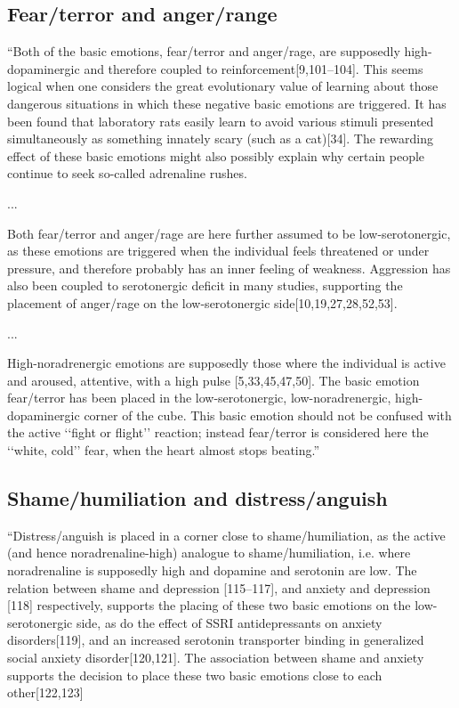 \subsection{Fear/terror and anger/range}

``Both of the basic emotions, fear/terror and anger/rage, are supposedly high-dopaminergic and therefore coupled to reinforcement[9,101–104]. This seems logical when one considers the great evolutionary value of learning about those dangerous situations in which these negative basic emotions are triggered. It has been found that laboratory rats easily learn to avoid various stimuli presented simultaneously as something innately scary (such as a cat)[34]. The rewarding effect of these basic emotions might also possibly explain why certain people continue to seek so-called adrenaline rushes. 

... 

Both fear/terror and anger/rage are here further assumed to be low-serotonergic, as these emotions are triggered when the individual feels threatened or under pressure, and therefore probably has an inner feeling of weakness. Aggression has also been coupled to serotonergic deficit in many studies, supporting the placement of anger/rage on the low-serotonergic side[10,19,27,28,52,53].

...

High-noradrenergic emotions are supposedly those where the individual is active and aroused, attentive, with a high pulse [5,33,45,47,50]. The basic emotion fear/terror has been placed in the low-serotonergic, low-noradrenergic, high-dopaminergic corner of the cube. This basic emotion should not be confused with the active ‘‘fight or flight’’ reaction; instead fear/terror is considered here the ‘‘white, cold’’ fear, when the heart almost stops beating.''

\subsection{Shame/humiliation and distress/anguish}

``Distress/anguish is placed in a corner close to shame/humiliation, as the active (and hence noradrenaline-high) analogue to shame/humiliation, i.e. where noradrenaline is supposedly high and dopamine and serotonin are low. The relation between shame and depression [115–117], and anxiety and depression [118] respectively, supports the placing of these two basic emotions on the low-serotonergic side, as do the effect of SSRI antidepressants on anxiety disorders[119], and an increased serotonin transporter binding in generalized social anxiety disorder[120,121]. The association between shame and anxiety supports the decision to place these two basic emotions close to each other[122,123]

